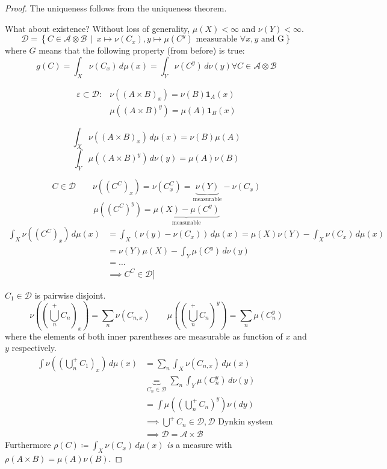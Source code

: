 \documentclass[a4paper]{article}
\numberwithin{lecref}{section}
\theoremstyle{break}
\newcommand{\SetDef}[2]{\left\{#1\,\mid\,#2\right\}}
\begin{document}
\begin{proof}
  The uniqueness follows from the uniqueness theorem.

  What about existence? Without loss of generality, $\mu(X) < \infty$ and $\nu(Y) < \infty$.
  \[
    \mathcal D = \SetDef{C \in \mathcal A \otimes \mathcal B}%
      {x \mapsto \nu(C_x), y \mapsto \mu(C^y) \text{ measurable }\forall x, y \text{ and G}}
  \]
  where $G$ means that the following property (from before) is true:
  \[ g(C) = \int_X \nu(C_x) \, d\mu(x) = \int_Y \nu(C^y) \, d\nu(y) \forall C \in \mathcal A \otimes \mathcal B \]

  \begin{align*}
    \varepsilon \subset \mathcal D:
      & \nu((A \times B)_x) = \nu(B) \mathbf{1}_A(x) \\
      & \mu((A \times B)^y) = \mu(A) \mathbf{1}_B(x)
  \end{align*}

  \[ \int_{X} \nu((A \times B)_x) \, d\mu(x) = \nu(B) \mu(A) \]
  \[ \int_{Y} \mu((A \times B)^y) \, d\nu(y) = \mu(A) \nu(B) \]

  \[ C \in \mathcal D \qquad \nu\left((C^C)_x\right) = \nu(C_x^C) = \underbrace{\nu(Y)}_{\text{measurable}} - \nu(C_x) \]
  \[ \mu((C^C)^y) = \underbrace{\mu(X) - \mu(C^y)}_{\text{measurable}} \]
  \begin{align*}
    \int_X \nu((C^C)_x) \, d\mu(x)
      &= \int_X \left(\nu(y) - \nu(C_x)\right) \, d\mu(x) = \mu(X) \nu(Y) - \int_X \nu(C_x) \, d\mu(x) \\
      &= \nu(Y) \mu(X) - \int_Y \mu(C^y) \, d\nu(y) \\
      &= \dots \\
      &\implies C^C \in \mathcal D]
  \end{align*}

  $C_1 \in \mathcal D$ is pairwise disjoint.
  \[ \nu\left(\left(\bigcup_n^+ C_n\right)_x\right) = \sum_n \nu(C_{n,x}) \qquad \mu\left(\left(\bigcup_n^+ C_n\right)^y\right) = \sum_n \mu(C_n^y) \]
  where the elements of both inner parentheses are measurable as function of $x$ and $y$ respectively.
  \begin{align*}
    \int \nu\left(\left(\bigcup_n^+ C_1\right)_x\right) \, d\mu(x)
      &= \sum_n \int_X \nu(C_{n,x}) \, d\mu(x) \\
      &\underbrace{=}_{C_n \in \mathcal D} \sum_n \int_Y \mu(C_n^y) \, d\nu(y) \\
      &= \int \mu\left(\left(\bigcup_n^+ C_n\right)^y\right) \nu(dy) \\
      &\implies \bigcup^+ C_n \in \mathcal D, \mathcal D \text{ Dynkin system } \\
      &\implies \mathcal D = \mathcal A \times \mathcal B
  \end{align*}
  Furthermore $\rho(C) \coloneqq \int_X \nu(C_x) \, d\mu(x)$ \emph{is} a measure with $\rho(A \times B) = \mu(A) \nu(B)$.
\end{proof}
\end{document}
